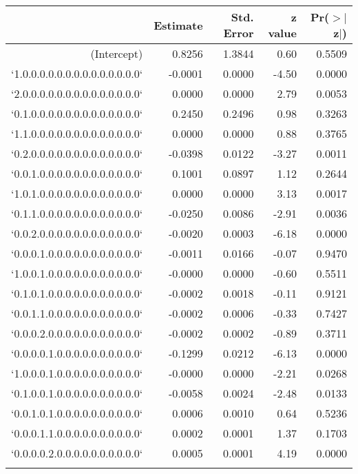 \begin{table}[ht]
\centering
\begin{tabular}{rrrrr}
  \hline
 & Estimate & Std. Error & z value & Pr($>$$|$z$|$) \\ 
  \hline
(Intercept) & 0.8256 & 1.3844 & 0.60 & 0.5509 \\ 
  `1.0.0.0.0.0.0.0.0.0.0.0.0.0.0` & -0.0001 & 0.0000 & -4.50 & 0.0000 \\ 
  `2.0.0.0.0.0.0.0.0.0.0.0.0.0.0` & 0.0000 & 0.0000 & 2.79 & 0.0053 \\ 
  `0.1.0.0.0.0.0.0.0.0.0.0.0.0.0` & 0.2450 & 0.2496 & 0.98 & 0.3263 \\ 
  `1.1.0.0.0.0.0.0.0.0.0.0.0.0.0` & 0.0000 & 0.0000 & 0.88 & 0.3765 \\ 
  `0.2.0.0.0.0.0.0.0.0.0.0.0.0.0` & -0.0398 & 0.0122 & -3.27 & 0.0011 \\ 
  `0.0.1.0.0.0.0.0.0.0.0.0.0.0.0` & 0.1001 & 0.0897 & 1.12 & 0.2644 \\ 
  `1.0.1.0.0.0.0.0.0.0.0.0.0.0.0` & 0.0000 & 0.0000 & 3.13 & 0.0017 \\ 
  `0.1.1.0.0.0.0.0.0.0.0.0.0.0.0` & -0.0250 & 0.0086 & -2.91 & 0.0036 \\ 
  `0.0.2.0.0.0.0.0.0.0.0.0.0.0.0` & -0.0020 & 0.0003 & -6.18 & 0.0000 \\ 
  `0.0.0.1.0.0.0.0.0.0.0.0.0.0.0` & -0.0011 & 0.0166 & -0.07 & 0.9470 \\ 
  `1.0.0.1.0.0.0.0.0.0.0.0.0.0.0` & -0.0000 & 0.0000 & -0.60 & 0.5511 \\ 
  `0.1.0.1.0.0.0.0.0.0.0.0.0.0.0` & -0.0002 & 0.0018 & -0.11 & 0.9121 \\ 
  `0.0.1.1.0.0.0.0.0.0.0.0.0.0.0` & -0.0002 & 0.0006 & -0.33 & 0.7427 \\ 
  `0.0.0.2.0.0.0.0.0.0.0.0.0.0.0` & -0.0002 & 0.0002 & -0.89 & 0.3711 \\ 
  `0.0.0.0.1.0.0.0.0.0.0.0.0.0.0` & -0.1299 & 0.0212 & -6.13 & 0.0000 \\ 
  `1.0.0.0.1.0.0.0.0.0.0.0.0.0.0` & -0.0000 & 0.0000 & -2.21 & 0.0268 \\ 
  `0.1.0.0.1.0.0.0.0.0.0.0.0.0.0` & -0.0058 & 0.0024 & -2.48 & 0.0133 \\ 
  `0.0.1.0.1.0.0.0.0.0.0.0.0.0.0` & 0.0006 & 0.0010 & 0.64 & 0.5236 \\ 
  `0.0.0.1.1.0.0.0.0.0.0.0.0.0.0` & 0.0002 & 0.0001 & 1.37 & 0.1703 \\ 
  `0.0.0.0.2.0.0.0.0.0.0.0.0.0.0` & 0.0005 & 0.0001 & 4.19 & 0.0000 \\ 
$$
\end{tabular}
\end{table}
